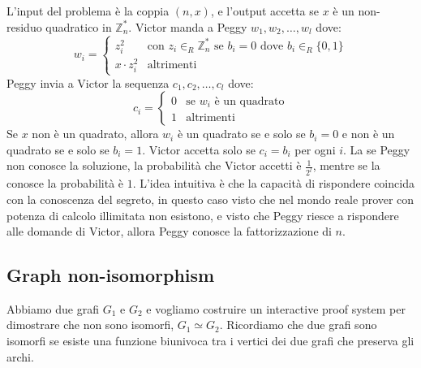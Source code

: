 L'input del problema è la coppia $(n,x)$, e l'output accetta se $x$ è un non-residuo quadratico in $\mathbb{Z}_n^*$.
Victor manda a Peggy $w_1, w_2, \dots, w_l$ dove:
\[
  w_i = \begin{cases}
    z_i^2 & \text{con } z_i \in_R \mathbb{Z}_n^* \text{ se }b_i = 0 \text{ dove }b_i \in_R \{0,1\} \\
    x \cdot z_i^2 & \text{altrimenti}  
    \end{cases}
\]
Peggy invia a Victor la sequenza $c_1, c_2, \dots, c_l$ dove:
\[
  c_i = \begin{cases}
    0 & \text{se }w_i \text{ è un quadrato} \\
    1 & \text{altrimenti}
    \end{cases}
\]
Se $x$ non è un quadrato, allora $w_i$ è un quadrato se e solo se $b_i = 0$ e
non è un quadrato se e solo se $b_i = 1$. Victor accetta solo se $c_i = b_i$ per ogni $i$.
La se Peggy non conosce la soluzione, la probabilità che Victor accetti è $\frac{1}{2^l}$, 
mentre se la conosce la probabilità è $1$.
L'idea intuitiva è che la capacità di rispondere coincida con la conoscenza del segreto, in questo caso 
visto che nel mondo reale prover con potenza di calcolo illimitata non esistono, e visto 
che Peggy riesce a rispondere alle domande di Victor, allora Peggy conosce la fattorizzazione 
di $n$.
\subsection{Graph non-isomorphism}
Abbiamo due grafi $G_1$ e $G_2$ e vogliamo costruire un interactive proof system per dimostrare che non sono isomorfi,
$G_1 \simeq  G_2$. Ricordiamo che due grafi sono isomorfi se esiste una funzione biunivoca tra i vertici dei due
grafi che preserva gli archi.

